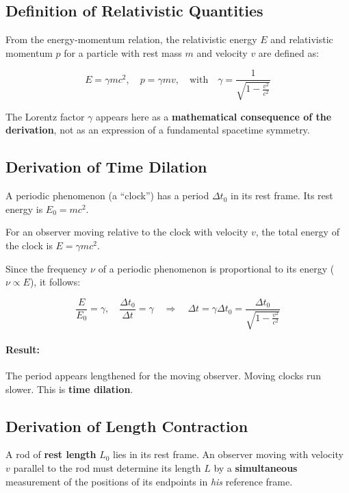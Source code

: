 \subsection{Definition of Relativistic Quantities}
From the energy-momentum relation, the relativistic energy $E$ and relativistic momentum $p$ for a particle with rest mass $m$ and velocity $v$ are defined as:

\begin{equation}
    \label{eq:relativistische_energie}
    E = \gamma m c^2, \quad p = \gamma m v, \quad \text{with} \quad \gamma = \frac{1}{\sqrt{1 - \frac{v^2}{c^2}}}
\end{equation}

The Lorentz factor $\gamma$ appears here as a \textbf{mathematical consequence of the derivation}, not as an expression of a fundamental spacetime symmetry.

\subsection{Derivation of Time Dilation}
A periodic phenomenon (a \enquote{clock}) has a period $\Delta t_0$ in its rest frame. Its rest energy is $E_0 = mc^2$.

For an observer moving relative to the clock with velocity $v$, the total energy of the clock is $E = \gamma mc^2$.

Since the frequency $\nu$ of a periodic phenomenon is proportional to its energy ($\nu \propto E$), it follows:

\begin{equation}
    \label{eq:zeitdilatation}
    \frac{E}{E_0} = \gamma, \quad \frac{\Delta t_0}{\Delta t} = \gamma \quad \Rightarrow \quad \Delta t = \gamma \Delta t_0 = \frac{\Delta t_0}{\sqrt{1 - \frac{v^2}{c^2}}}
\end{equation}

\paragraph{Result:} The period appears lengthened for the moving observer. Moving clocks run slower. This is \textbf{time dilation}.

\subsection{Derivation of Length Contraction}
A rod of \textbf{rest length} $L_0$ lies in its rest frame. An observer moving with velocity $v$ parallel to the rod must determine its length $L$ by a \textbf{simultaneous} measurement of the positions of its endpoints in \textit{his} reference frame.

